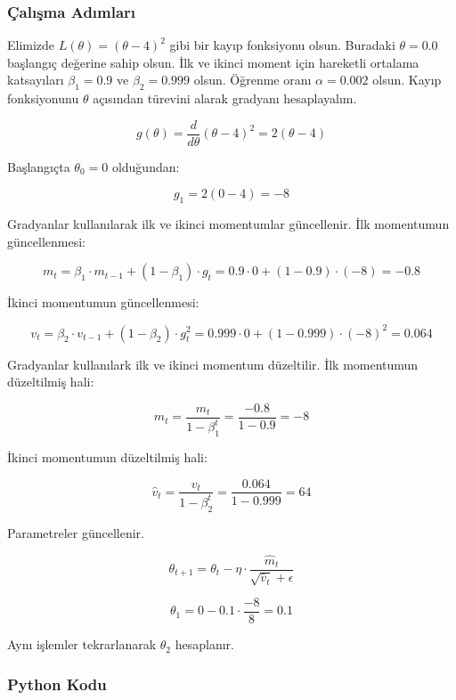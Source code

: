 \subsubsection{Çalışma Adımları}

Elimizde $L(\theta) = (\theta - 4)^2$ gibi bir kayıp fonksiyonu olsun. Buradaki $\theta = 0.0$ başlangıç değerine sahip olsun. İlk ve ikinci moment için hareketli ortalama katsayıları $\beta_1 = 0.9$ ve $\beta_2 = 0.999$ olsun. Öğrenme oranı $\alpha = 0.002$ olsun. Kayıp fonksiyonunu $\theta$ açısından türevini alarak gradyanı hesaplayalım.

\[ g(\theta) = \frac{d}{d \theta} (\theta - 4)^2 = 2 (\theta - 4) \]

Başlangıçta $\theta_0 = 0$ olduğundan:

\[ g_1 = 2 (0 - 4) = -8 \]

Gradyanlar kullanılarak ilk ve ikinci momentumlar güncellenir. İlk momentumun güncellenmesi:

\[ m_t = \beta_1 \cdot m_{t-1} + (1 - \beta_1) \cdot g_t = 0.9 \cdot 0 + (1 - 0.9) \cdot (-8) = -0.8 \]

İkinci momentumun güncellenmesi:

\[ v_t = \beta_2 \cdot v_{t-1} + (1 - \beta_2) \cdot g_{t}^2 = 0.999 \cdot 0 + (1 - 0.999) \cdot (-8)^2 = 0.064 \]

Gradyanlar kullanılark ilk ve ikinci momentum düzeltilir. İlk momentumun düzeltilmiş hali:

\[ \hat{m}_t = \frac{m_t}{1 - \beta_{1}^t} = \frac{-0.8}{1 - 0.9} = -8 \]

İkinci momentumun düzeltilmiş hali:

\[ \hat{v}_t = \frac{v_t}{1 - \beta_{2}^t} = \frac{0.064}{1 - 0.999} = 64 \]

Parametreler güncellenir.

\[ \theta_{t+1} = \theta_t - \eta \cdot \frac{\hat{m}_t}{\sqrt{\hat{v}_t} + \epsilon} \]

\[ \theta_1 = 0 - 0.1 \cdot \frac{-8}{8} = 0.1 \]

Aynı işlemler tekrarlanarak $\theta_2$ hesaplanır.

\subsubsection{Python Kodu}

